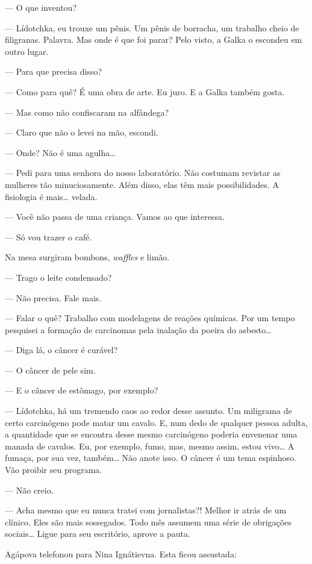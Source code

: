 --- O que inventou?

--- Lídotchka, eu trouxe um pênis. Um pênis de borracha, um trabalho
cheio de filigranas. Palavra. Mas onde é que foi parar? Pelo visto, a
Galka o escondeu em outro lugar.

--- Para que precisa disso?

--- Como para quê? É uma obra de arte. Eu juro. E a Galka também gosta.

--- Mas como não confiscaram na alfândega?

--- Claro que não o levei na mão, escondi.

--- Onde? Não é uma agulha\ldots{}

--- Pedi para uma senhora do nosso laboratório. Não costumam revistar as
mulheres tão minuciosamente. Além disso, elas têm mais possibilidades. A
fisiologia é mais\ldots{} velada.

--- Você não passa de uma criança. Vamos ao que interessa.

--- Só vou trazer o café.

Na mesa surgiram bombons, \emph{waffles} e limão.

--- Trago o leite condensado?

--- Não precisa. Fale mais.

--- Falar o quê? Trabalho com modelagens de reações químicas. Por um
tempo pesquisei a formação de carcinomas pela inalação da poeira do
asbesto\ldots{}

--- Diga lá, o câncer é curável?

--- O câncer de pele sim.

--- E o câncer de estômago, por exemplo?

--- Lídotchka, há um tremendo caos ao redor desse assunto. Um miligrama
de certo carcinógeno pode matar um cavalo. E, num dedo de qualquer
pessoa adulta, a quantidade que se encontra desse mesmo carcinógeno
poderia envenenar uma manada de cavalos. Eu, por exemplo, fumo, mas,
mesmo assim, estou vivo\ldots{} A fumaça, por sua vez, também\ldots{} Não anote
isso. O câncer é um tema espinhoso. Vão proibir seu programa.

--- Não creio.

--- Acha mesmo que eu nunca tratei com jornalistas?! Melhor ir atrás de
um clínico. Eles são mais sossegados. Todo mês assumem uma série de
obrigações sociais\ldots{} Ligue para seu escritório, aprove a pauta.

Agápova telefonou para Nina Ignátievna. Esta ficou assustada:

